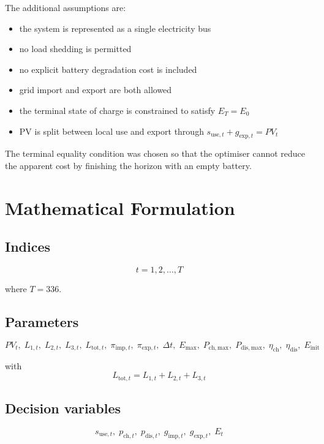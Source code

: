 \documentclass[12pt,a4paper]{article}
\begin{document}
The additional assumptions are:

\begin{itemize}
    \item the system is represented as a single electricity bus
    \item no load shedding is permitted
    \item no explicit battery degradation cost is included
    \item grid import and export are both allowed
    \item the terminal state of charge is constrained to satisfy $E_T = E_0$
    \item PV is split between local use and export through $s_{\mathrm{use},t} + g_{\mathrm{exp},t} = PV_t$
\end{itemize}

The terminal equality condition was chosen so that the optimiser cannot reduce the apparent cost by finishing the horizon with an empty battery.

\section{Mathematical Formulation}

\subsection{Indices}

\[
t = 1,2,\dots,T
\]

where $T=336$.

\subsection{Parameters}

\[
PV_t,\;L_{1,t},\;L_{2,t},\;L_{3,t},\;L_{\mathrm{tot},t},\;\pi_{\mathrm{imp},t},\;\pi_{\mathrm{exp},t},\;\Delta t,\;E_{\max},\;P_{\mathrm{ch,max}},\;P_{\mathrm{dis,max}},\;\eta_{\mathrm{ch}},\;\eta_{\mathrm{dis}},\;E_{\mathrm{init}}
\]

with
\[
L_{\mathrm{tot},t} = L_{1,t} + L_{2,t} + L_{3,t}
\]

\subsection{Decision variables}

\[
s_{\mathrm{use},t},\;p_{\mathrm{ch},t},\;p_{\mathrm{dis},t},\;g_{\mathrm{imp},t},\;g_{\mathrm{exp},t},\;E_t
\]
\end{document}
